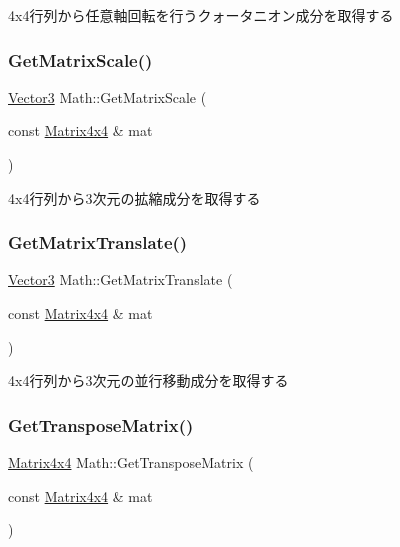 4x4行列から任意軸回転を行うクォータニオン成分を取得する 

\mbox{\label{namespace_math_af3d07a84dd7006820b10c0dcca8d649d}} 
\subsubsection{\texorpdfstring{Get\+Matrix\+Scale()}{GetMatrixScale()}}
{\footnotesize\ttfamily \mbox{\hyperlink{struct_math_1_1_vector3}{Vector3}} Math\+::\+Get\+Matrix\+Scale (\begin{DoxyParamCaption}\item[{const \mbox{\hyperlink{struct_math_1_1_matrix4x4}{Matrix4x4}} \&}]{mat }\end{DoxyParamCaption})}



4x4行列から3次元の拡縮成分を取得する 

\mbox{\label{namespace_math_a362448daab24abbbe2f8aeb947396e45}} 
\subsubsection{\texorpdfstring{Get\+Matrix\+Translate()}{GetMatrixTranslate()}}
{\footnotesize\ttfamily \mbox{\hyperlink{struct_math_1_1_vector3}{Vector3}} Math\+::\+Get\+Matrix\+Translate (\begin{DoxyParamCaption}\item[{const \mbox{\hyperlink{struct_math_1_1_matrix4x4}{Matrix4x4}} \&}]{mat }\end{DoxyParamCaption})}



4x4行列から3次元の並行移動成分を取得する 

\mbox{\label{namespace_math_a4cc0372b98a0dd4833848ee1bf268332}} 
\subsubsection{\texorpdfstring{Get\+Transpose\+Matrix()}{GetTransposeMatrix()}}
{\footnotesize\ttfamily \mbox{\hyperlink{struct_math_1_1_matrix4x4}{Matrix4x4}} Math\+::\+Get\+Transpose\+Matrix (\begin{DoxyParamCaption}\item[{const \mbox{\hyperlink{struct_math_1_1_matrix4x4}{Matrix4x4}} \&}]{mat }\end{DoxyParamCaption})}



